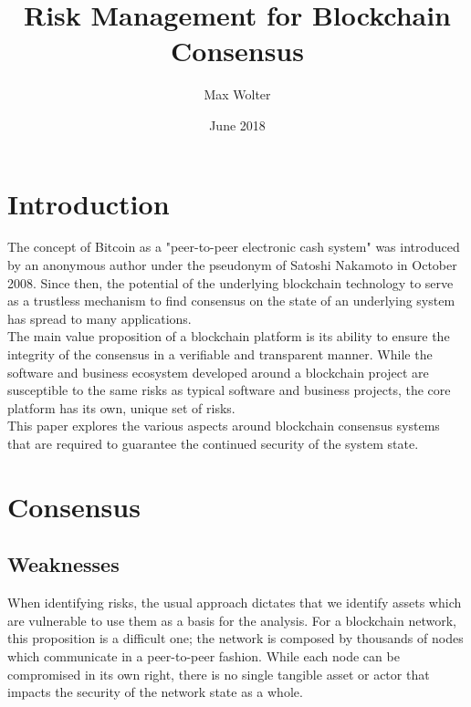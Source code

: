 \documentclass[11pt,a4paper,draft]{article}
\title{Risk Management for Blockchain Consensus}
\author{Max Wolter}
\date{June 2018}
\begin{document}
\maketitle

\begin{abstract}

\end{abstract}

\section{Introduction}

The concept of Bitcoin as a "peer-to-peer electronic cash system" was introduced by an anonymous author under the pseudonym of Satoshi Nakamoto in October 2008. Since then, the potential of the underlying blockchain technology to serve as a trustless mechanism to find consensus on the state of an underlying system has spread to many applications.\\

The main value proposition of a blockchain platform is its ability to ensure the integrity of the consensus in a verifiable and transparent manner. While the software and business ecosystem developed around a blockchain project are susceptible to the same risks as typical software and business projects, the core platform has its own, unique set of risks.\\

This paper explores the various aspects around blockchain consensus systems that are required to guarantee the continued security of the system state.\\

\section{Consensus}

\subsection{Weaknesses}

When identifying risks, the usual approach dictates that we identify assets which are vulnerable to use them as a basis for the analysis. For a blockchain network, this proposition is a difficult one; the network is composed by thousands of nodes which communicate in a peer-to-peer fashion. While each node can be compromised in its own right, there is no single tangible asset or actor that impacts the security of the network state as a whole.\\
\end{document}
